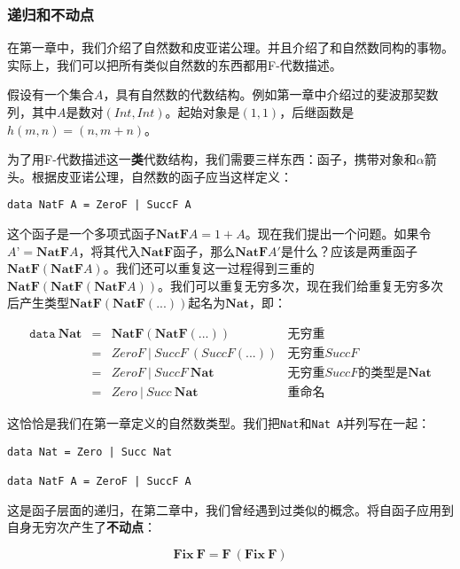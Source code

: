 \documentclass{article}
\begin{document}
\subsubsection{递归和不动点}

在第一章中，我们介绍了自然数和皮亚诺公理。并且介绍了和自然数同构的事物。实际上，我们可以把所有类似自然数的东西都用F-代数描述。

假设有一个集合$A$，具有自然数的代数结构。例如第一章中介绍过的斐波那契数列，其中$A$是数对$(Int, Int)$。起始对象是$(1, 1)$，后继函数是$h(m, n) = (n, m + n)$。

为了用F-代数描述这一\textbf{类}代数结构，我们需要三样东西：函子，携带对象和$\alpha$箭头。根据皮亚诺公理，自然数的函子应当这样定义：

\lstset{frame=none}
\begin{lstlisting}
data NatF A = ZeroF | SuccF A
\end{lstlisting}

这个函子是一个多项式函子$\mathbf{NatF} A = 1 + A$。现在我们提出一个问题。如果令$A’ = \mathbf{NatF} A$，将其代入$\mathbf{NatF}$函子，那么$\mathbf{NatF} A'$是什么？应该是两重函子$\mathbf{NatF}(\mathbf{NatF} A)$。我们还可以重复这一过程得到三重的$\mathbf{NatF}(\mathbf{NatF}(\mathbf{NatF} A))$。我们可以重复无穷多次，现在我们给重复无穷多次后产生类型$\mathbf{NatF}(\mathbf{NatF}(...))$起名为$\mathbf{Nat}$，即：

\[
\begin{array}{rcll}
\texttt{data}\ \mathbf{Nat} & = & \mathbf{NatF}(\mathbf{NatF}(...)) & \text{无穷重} \\
         & = & ZeroF\ |\ SuccF\ (SuccF (...)) & \text{无穷重}SuccF \\
         & = & ZeroF\ |\ SuccF\ \mathbf{Nat} & \text{无穷重}SuccF\text{的类型是}\mathbf{Nat} \\
         & = & Zero\ |\ Succ\ \mathbf{Nat} & \text{重命名}
\end{array}
\]

这恰恰是我们在第一章定义的自然数类型。我们把\texttt{Nat}和\texttt{Nat A}并列写在一起：

\begin{lstlisting}
data Nat = Zero | Succ Nat

data NatF A = ZeroF | SuccF A
\end{lstlisting}

这是函子层面的递归，在第二章中，我们曾经遇到过类似的概念。将自函子应用到自身无穷次产生了\textbf{不动点}：

\[
\mathbf{Fix}\ \mathbf{F} = \mathbf{F}\ (\mathbf{Fix}\ \mathbf{F})
\]
\end{document}
